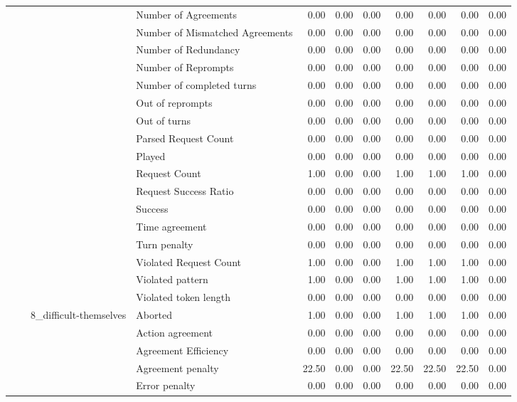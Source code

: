 \begin{tabular}{llllrrrrrrr}
 &  &  & Number of Agreements & 0.00 & 0.00 & 0.00 & 0.00 & 0.00 & 0.00 & 0.00 \\
 &  &  & Number of Mismatched Agreements & 0.00 & 0.00 & 0.00 & 0.00 & 0.00 & 0.00 & 0.00 \\
 &  &  & Number of Redundancy & 0.00 & 0.00 & 0.00 & 0.00 & 0.00 & 0.00 & 0.00 \\
 &  &  & Number of Reprompts & 0.00 & 0.00 & 0.00 & 0.00 & 0.00 & 0.00 & 0.00 \\
 &  &  & Number of completed turns & 0.00 & 0.00 & 0.00 & 0.00 & 0.00 & 0.00 & 0.00 \\
 &  &  & Out of reprompts & 0.00 & 0.00 & 0.00 & 0.00 & 0.00 & 0.00 & 0.00 \\
 &  &  & Out of turns & 0.00 & 0.00 & 0.00 & 0.00 & 0.00 & 0.00 & 0.00 \\
 &  &  & Parsed Request Count & 0.00 & 0.00 & 0.00 & 0.00 & 0.00 & 0.00 & 0.00 \\
 &  &  & Played & 0.00 & 0.00 & 0.00 & 0.00 & 0.00 & 0.00 & 0.00 \\
 &  &  & Request Count & 1.00 & 0.00 & 0.00 & 1.00 & 1.00 & 1.00 & 0.00 \\
 &  &  & Request Success Ratio & 0.00 & 0.00 & 0.00 & 0.00 & 0.00 & 0.00 & 0.00 \\
 &  &  & Success & 0.00 & 0.00 & 0.00 & 0.00 & 0.00 & 0.00 & 0.00 \\
 &  &  & Time agreement & 0.00 & 0.00 & 0.00 & 0.00 & 0.00 & 0.00 & 0.00 \\
 &  &  & Turn penalty & 0.00 & 0.00 & 0.00 & 0.00 & 0.00 & 0.00 & 0.00 \\
 &  &  & Violated Request Count & 1.00 & 0.00 & 0.00 & 1.00 & 1.00 & 1.00 & 0.00 \\
 &  &  & Violated pattern & 1.00 & 0.00 & 0.00 & 1.00 & 1.00 & 1.00 & 0.00 \\
 &  &  & Violated token length & 0.00 & 0.00 & 0.00 & 0.00 & 0.00 & 0.00 & 0.00 \\
\cline{3-11}
 &  & \multirow[t]{27}{*}{8_difficult-themselves} & Aborted & 1.00 & 0.00 & 0.00 & 1.00 & 1.00 & 1.00 & 0.00 \\
 &  &  & Action agreement & 0.00 & 0.00 & 0.00 & 0.00 & 0.00 & 0.00 & 0.00 \\
 &  &  & Agreement Efficiency & 0.00 & 0.00 & 0.00 & 0.00 & 0.00 & 0.00 & 0.00 \\
 &  &  & Agreement penalty & 22.50 & 0.00 & 0.00 & 22.50 & 22.50 & 22.50 & 0.00 \\
 &  &  & Error penalty & 0.00 & 0.00 & 0.00 & 0.00 & 0.00 & 0.00 & 0.00 \\

\end{tabular}

